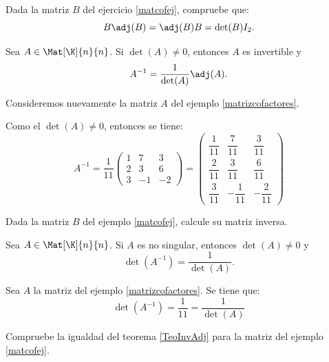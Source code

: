 \documentclass[compacto,10pt]{pubciencias-notas}
\begin{document}
\begin{ejer} 
    Dada la matriz $B$ del ejercicio \ref{matcofej}, compruebe que:
    \[
        B \adj(B) = \adj(B) B = \det(B) I_{2}.
    \]
\end{ejer}

\begin{cor}
Sea $A\in\Mat[\K]{n}{n}$. Si $\det(A) \neq 0$, entonces 
$A$ es invertible y 
\[
    A^{- 1} = \dfrac{1}{\det(A)}\adj(A).
\]
\end{cor}

\begin{ejem}
    Consideremos nuevamente la matriz $A$ del ejemplo \ref{matrizcofactores}.
    
    \noindent Como el $\det(A) \not = 0$, entonces se tiene:
    \[
        A^{-1} = \dfrac{1}{11}
        \begin{pmatrix}
            1 & 7 & 3 \\
            2 & 3 & 6 \\
            3 & -1 & -2
        \end{pmatrix} = 
        \begin{pmatrix}
            \dfrac{1}{11} & \dfrac{7}{11} & \dfrac{3}{11} \\
            \dfrac{2}{11} & \dfrac{3}{11} & \dfrac{6}{11} \\
            \dfrac{3}{11} & -\dfrac{1}{11} & -\dfrac{2}{11}
        \end{pmatrix}
    \]
\end{ejem}

\begin{ejer} Dada la matriz $B$ del ejemplo \ref{matcofej}, calcule su matriz inversa.
\end{ejer}

\begin{teo}\label{TeoInvAdj}
    Sea $A \in \Mat[\K]{n}{n}$. Si $A$ es no singular, entonces $\det(A) \neq 0$ y 
    \[
        \det(A^{-1}) = \dfrac{1}{\det(A)}.
    \]
\end{teo}

\begin{ejem}
    Sea $A$ la matriz del ejemplo \ref{matrizcofactores}. Se tiene que:
    \[
        \det(A^{-1}) = \dfrac{1}{11} = \dfrac{1}{\det(A)}
    \]
\end{ejem}

\begin{ejer} Compruebe la igualdad del teorema \ref{TeoInvAdj} para la matriz del ejemplo \ref{matcofej}.
\end{ejer}
\end{document}
